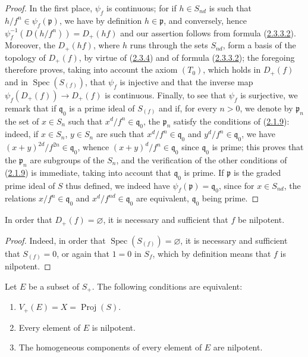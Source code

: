 \begin{proof}
In the first place, $\psi_f$ is continuous; for if $h\in S_{nd}$ is such
that $h/f^n\in\psi_f(\mathfrak{p})$, we have by definition
$h\in\mathfrak{p}$, and conversely, hence $\psi_f^{-1}(D(h/f^n))=D_+(hf)$
and our assertion follows from formula
(\hyperref[II.2.3.3.2]{2.3.3.2}). Moreover, the $D_+(hf)$, where $h$
runs through the sets $S_{nd}$, form a basis of the topology of
$D_+(f)$, by virtue of (\hyperref[II.2.3.4]{2.3.4}) and of formula
(\hyperref[II.2.3.3.2]{2.3.3.2}); the
foregoing therefore proves, taking into account the axiom $(T_0)$, which
holds in $D_+(f)$ and in $\operatorname{Spec}(S_{(f)})$, that $\psi_f$ is
injective and that the inverse map
$\psi_f(D_+(f))\longrightarrow D_+(f)$ is continuous. Finally, to see that
$\psi_f$ is surjective, we remark that if $\mathfrak{q}_0$ is a prime
ideal of $S_{(f)}$ and if, for every $n>0$, we denote by
$\mathfrak{p}_n$ the set of $x\in S_n$ such that
$x^d/f^n\in\mathfrak{q}_0$, the $\mathfrak{p}_n$ satisfy the conditions
of (\hyperref[II.2.1.9]{2.1.9}): indeed, if $x\in S_n$, $y\in S_n$
are such that $x^d/f^n\in\mathfrak{q}_0$ and
$y^d/f^n\in\mathfrak{q}_0$, we have
$(x+y)^{2d}/f^{2n}\in\mathfrak{q}_0$, whence
$(x+y)^d/f^n\in\mathfrak{q}_0$ since $\mathfrak{q}_0$ is prime;
this proves that the $\mathfrak{p}_n$ are subgroups of the $S_n$, and the
verification of the other conditions of
(\hyperref[II.2.1.9]{2.1.9}) is immediate, taking into account that
$\mathfrak{q}_0$ is prime. If $\mathfrak{p}$ is the graded prime ideal
of $S$ thus defined, we indeed have
$\psi_f(\mathfrak{p})=\mathfrak{q}_0$, since for $x\in S_{nd}$, the relations
$x/f^n\in\mathfrak{q}_0$ and $x^d/f^{nd}\in\mathfrak{q}_0$ are
equivalent, $\mathfrak{q}_0$ being prime.
\end{proof}

\begin{corollary}[2.3.7]
\label{II.2.3.7}
In order that $D_+(f)=\varnothing$, it is necessary and sufficient that $f$
be nilpotent.
\end{corollary}

\begin{proof}
Indeed, in order that $\operatorname{Spec}(S_{(f)})=\varnothing$, it is
necessary and sufficient that $S_{(f)}=0$, or again that $1=0$ in $S_f$,
which by definition means that $f$ is nilpotent.
\end{proof}

\begin{corollary}[2.3.8]
\label{II.2.3.8}
Let $E$ be a subset of $S_+$. The following conditions are equivalent:
\begin{enumerate}
  \item[\textit{a)}] $V_+(E)=X=\operatorname{Proj}(S)$.
  \item[\textit{b)}] Every element of $E$ is nilpotent.
  \item[\textit{c)}] The homogeneous components of every element of $E$ are
    nilpotent.
\end{enumerate}
\end{corollary}

